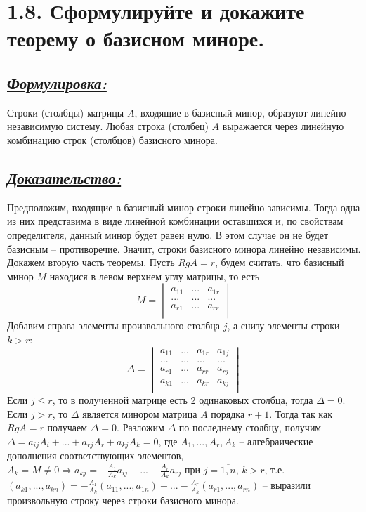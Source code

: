 \documentclass{article}
\begin{document}
\section*{\LARGE 1.8. Сформулируйте и докажите теорему о базисном миноре.}
\subsection*{\Large \underline{\textit{Формулировка: }}}
Строки (столбцы) матрицы $A$, входящие в базисный минор, образуют линейно независимую систему. Любая строка (столбец) $A$ выражается через линейную комбинацию строк (столбцов) базисного минора.

\subsection*{\Large \underline{\textit{Доказательство: }}}
Предположим, входящие в базисный минор строки линейно зависимы. Тогда одна из них представима в виде линейной комбинации оставшихся и, по свойствам определителя, данный минор будет равен нулю. В этом случае он не будет базисным -- противоречие. Значит, строки базисного минора линейно независимы.
\newline Докажем вторую часть теоремы. Пусть $RgA = r$, будем считать, что базисный минор $M$ находися в левом верхнем углу матрицы, то есть 
$$
M = 
\begin{vmatrix}
a_{11} & ... & a_{1r} \\
... & ... & ... \\
a_{r1} & ... & a_{rr} \\
\end{vmatrix}
$$
Добавим справа элементы произвольного столбца $j$, а снизу элементы строки $k > r$:
$$
\Delta = 
\begin{vmatrix}
a_{11} & ... & a_{1r} & a_{1j} \\
... & ... & ... & ... \\
a_{r1} & ... & a_{rr} & a_{rj }\\
a_{k1} & ... & a_{kr} & a_{kj }\\
\end{vmatrix}
$$
Если $j \le r$, то в полученной матрице есть 2 одинаковых столбца, тогда $\Delta = 0$.
\newline Если $j > r$, то $\Delta$ является минором матрица $A$ порядка $r + 1$. Тогда так как $RgA = r$ получаем $\Delta = 0$. Разложим $\Delta$ по последнему столбцу, получим $\Delta = a_{ij}A_{i} + ... + a_{rj}A_{r} + a_{kj}A_{k} = 0$, где $A_{1}, ..., A_{r}, A_{k}$ -- алгебраические дополнения соответствующих элементов, $A_{k} = M \ne 0 \Rightarrow a_{kj} = -\frac{A_1}{A_k}a_{ij} - ... - \frac{A_r}{A_k}a_{rj}$ при $j = \overline{1, n},\, k > r$, т.е. $(a_{k1}, ..., a_{kn}) = -\frac{A_1}{A_k}(a_{11}, ..., a_{1n}) - ... - \frac{A_r}{A_k}(a_{r1}, ..., a_{rn})$ -- выразили произвольную строку через строки базисного минора.
\end{document}
